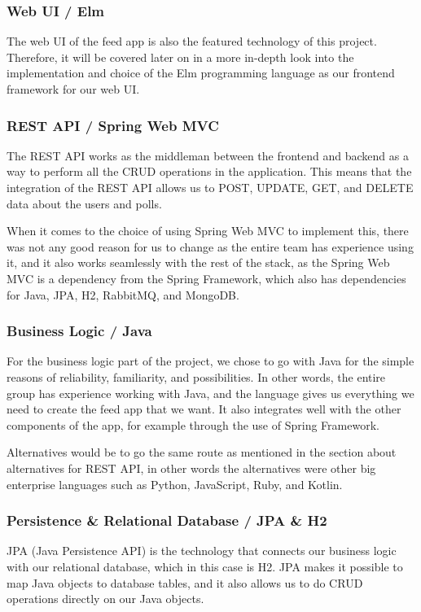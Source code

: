 \subsubsection{Web UI / Elm}
The web UI of the feed app is also the featured technology of this project. Therefore, it will be covered later on in a more in-depth look into the implementation and choice of the Elm programming language as our frontend framework for our web UI.

\subsubsection{REST API / Spring Web MVC}
The REST API works as the middleman between the frontend and backend as a way to perform all the CRUD operations in the application. This means that the integration of the REST API allows us to POST, UPDATE, GET, and DELETE data about the users and polls.

When it comes to the choice of using Spring Web MVC to implement this, there was not any good reason for us to change as the entire team has experience using it, and it also works seamlessly with the rest of the stack, as the Spring Web MVC is a dependency from the Spring Framework, which also has dependencies for Java, JPA, H2, RabbitMQ, and MongoDB. 

\subsubsection{Business Logic / Java}
For the business logic part of the project, we chose to go with Java for the simple reasons of reliability, familiarity, and possibilities. In other words, the entire group has experience working with Java, and the language gives us everything we need to create the feed app that we want. It also integrates well with the other components of the app, for example through the use of Spring Framework.

Alternatives would be to go the same route as mentioned in the section about alternatives for REST API, in other words the alternatives were other big enterprise languages such as Python, JavaScript, Ruby, and Kotlin. 

\subsubsection{Persistence \& Relational Database / JPA \& H2}
JPA (Java Persistence API) is the technology that connects our business logic with our relational database, which in this case is H2. JPA makes it possible to map Java objects to database tables, and it also allows us to do CRUD operations directly on our Java objects. 

